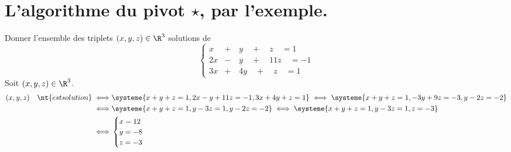 \documentclass[11pt]{article}
\begin{document}
\section{L'algorithme du pivot \texorpdfstring{$\star$}{Lg}, par l'exemple.}

\begin{ex}{}{}
    Donner l'ensemble des triplets $(x,y,z)\in\R^3$ solutions de
    \begin{equation*}
        \begin{cases}
            x&+\quad y\quad+\quad z\quad= 1\\
            2x&-\quad y\quad+\quad 11z\quad= -1\\
            3x&+\quad 4y\quad+\quad z\quad= 1
        \end{cases}
    \end{equation*}
    \tcblower
    Soit $(x,y,z)\in\R^3$.
    \begin{align*}
        (x,y,z)\quad\nt{est solution} \iff& \systeme{
            x+y+z=1,
            2x-y+11z=-1,
            3x+4y+z=1
        } \iff \systeme{
            x+y+z=1,
            -3y+9z=-3,
            y-2z=-2
        }\\ \iff& \systeme{
            x+y+z=1,
            y-3z=1,
            y-2z=-2
        } \iff \systeme{
            x+y+z=1,
            y-3z=1,
            z=-3
        }\\ \iff& \begin{cases}
            x=12\\
            y=-8\\
            z=-3
        \end{cases}
    \end{align*}
\end{ex}
\end{document}
